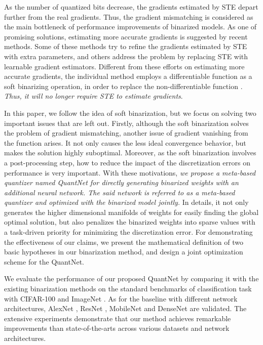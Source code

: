 \documentclass[runningheads]{llncs}
\begin{document}
As the number of quantized bits decrease,
the gradients estimated by STE depart further from the real gradients.
Thus, the gradient mismatching is considered as the main bottleneck of performance improvements of binarized models.
As one of promising solutions, estimating more accurate gradients is suggested by recent methods.
Some of these methods \cite{Liu2018Enhance,Wang2018Twostep,blended_grad2018,Uhlich2019DQ}
try to refine the gradients estimated by STE with extra parameters,
and others \cite{bai2019prox,chen2019meta} address the problem
by replacing STE with learnable gradient estimators.
Different from these efforts on estimating more accurate gradients,
the individual method \cite{lahoud2019self} employs a differentiable function  as a soft binarizing operation,
in order to replace the non-differentiable function .
\emph{Thus, it will no longer require STE to estimate gradients}.

In this paper, we follow the idea of soft binarization,
but we focus on solving two important issues that are left out.
Firstly, although the soft binarization solves the problem of gradient mismatching,
another issue of gradient vanishing from the function  arises.
It not only causes the less ideal convergence behavior, but makes the solution highly suboptimal.
Moreover, as the soft binarization involves a post-processing step,
how to reduce the impact of the discretization errors on performance is very important.
With these motivations, \emph{we propose a meta-based quantizer named QuantNet
for directly generating binarized weights with an additional neural network.
The said network is referred to as a meta-based quantizer and optimized with the binarized model jointly.}
In details, it not only generates the higher dimensional manifolds of weights for easily finding the global optimal solution,
but also penalizes the binarized weights into sparse values with a task-driven priority for minimizing the discretization error.
For demonstrating the effectiveness of our claims,
we present the mathematical definition of two basic hypotheses in our binarization method,
and design a joint optimization scheme for the QuantNet.

We evaluate the performance of our proposed QuantNet by comparing it with the existing binarization methods
on the standard benchmarks of classification task with
CIFAR-100 \cite{cifar10} and ImageNet \cite{Deng2009}.
As for the baseline with different network architectures,
AlexNet \cite{Krizhevsky2012}, ResNet \cite{he2016deep},
MobileNet \cite{sandler2018mobilenetv2} and DenseNet \cite{denseNet2017} are validated.
The extensive experiments demonstrate that our method achieves remarkable improvements
than state-of-the-arts across various datasets and network architectures.
\end{document}
